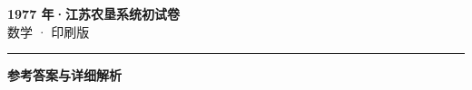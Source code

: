 \documentclass[zihao=5, a4paper]{ctexart}
\begin{document}
\begin{center}
  {\Large\bfseries 1977 年·江苏农垦系统初试卷}\\[4pt]
  {\large 数学 · 印刷版}
\end{center}
\medskip
{}

\par\bigskip\hrule\bigskip
{}
\begin{center}{\large\bfseries 参考答案与详细解析}\end{center}
\smallskip

\end{document}
